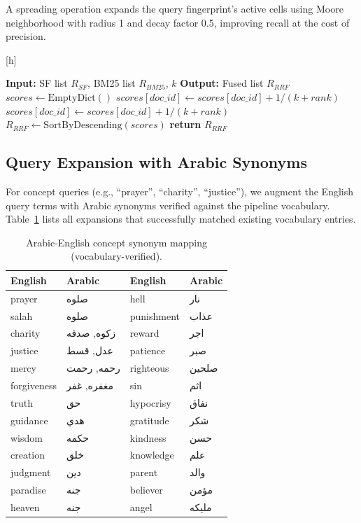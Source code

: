 \documentclass[conference]{IEEEtran}
\makeatletter
\newcounter{algorithm}
\newenvironment{algorithm}[1][h]
  {\@float{algorithm}[#1]\footnotesize}
  {\end@float}
\makeatother
\begin{document}
A spreading operation expands the query fingerprint's active cells using
Moore neighborhood with radius 1 and decay factor 0.5, improving recall
at the cost of precision.

\begin{algorithm}[h]
  \caption{RRF fusion of SF and BM25 rankings.}
  \label{alg:rrf}
  \footnotesize
  \begin{algorithmic}[1]
    \State \textbf{Input:} SF list $R_{SF}$, BM25 list $R_{BM25}$, $k$
    \State \textbf{Output:} Fused list $R_{RRF}$
    \State \quad
    \State $scores \gets \text{EmptyDict}()$
      \State $scores[doc\_id] \gets scores[doc\_id] + 1/(k + rank)$
    \EndFor
      \State $scores[doc\_id] \gets scores[doc\_id] + 1/(k + rank)$
    \EndFor
    \State $R_{RRF} \gets \text{SortByDescending}(scores)$
    \State \textbf{return} $R_{RRF}$
  \end{algorithmic}
\end{algorithm}

\subsection{Query Expansion with Arabic Synonyms}

For concept queries (e.g., ``prayer'', ``charity'', ``justice''), we
augment the English query terms with Arabic synonyms verified against
the pipeline vocabulary. Table~\ref{tab:synonyms} lists all expansions
that successfully matched existing vocabulary entries.

\begin{table}[t]
  \centering
  \caption{Arabic-English concept synonym mapping (vocabulary-verified).}
  \label{tab:synonyms}
  \footnotesize
  \begin{tabular}{llll}
    \toprule
    \textbf{English} & \textbf{Arabic} & \textbf{English} & \textbf{Arabic} \\
    \midrule
    prayer & صلوه & hell & نار \\
    salah & صلوه & punishment & عذاب \\
    charity & زكوه, صدقه & reward & اجر \\
    justice & عدل, قسط & patience & صبر \\
    mercy & رحمه, رحمت & righteous & صلحين \\
    forgiveness & مغفره, غفر & sin & اثم \\
    truth & حق & hypocrisy & نفاق \\
    guidance & هدي & gratitude & شكر \\
    wisdom & حكمه & kindness & حسن \\
    creation & خلق & knowledge & علم \\
    judgment & دين & parent & والد \\
    paradise & جنه & believer & مؤمن \\
    heaven & جنه & angel & مليكه \\
    \bottomrule
  \end{tabular}
\end{table}
\end{document}
